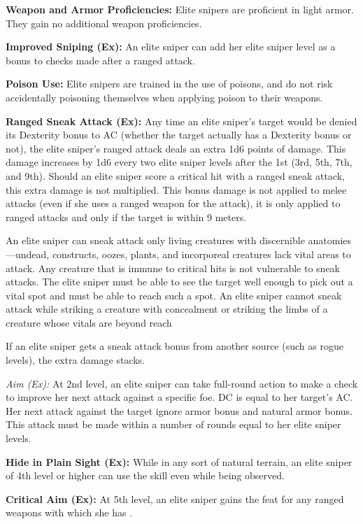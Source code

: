 {
\textbf{Weapon and Armor Proficiencies:} Elite snipers are proficient in light armor. They gain no additional weapon proficiencies.

\textbf{Improved Sniping (Ex):} An elite sniper can add her elite sniper level as a bonus to  checks made after a ranged attack.

\textbf{Poison Use:} Elite snipers are trained in the use of poisons, and do not risk accidentally poisoning themselves when applying poison to their weapons.

\textbf{Ranged Sneak Attack (Ex):} Any time an elite sniper's target would be denied its Dexterity bonus to AC (whether the target actually has a Dexterity bonus or not), the elite sniper's ranged attack deals an extra 1d6 points of damage. This damage increases by 1d6 every two elite sniper levels after the 1st (3rd, 5th, 7th, and 9th). Should an elite sniper score a critical hit with a ranged sneak attack, this extra damage is not multiplied. This bonus damage is not applied to melee attacks (even if she uses a ranged weapon for the attack), it is only applied to ranged attacks and only if the target is within 9 meters.

An elite sniper can sneak attack only living creatures with discernible anatomies---undead, constructs, oozes, plants, and incorporeal creatures lack vital areas to attack. Any creature that is immune to critical hits is not vulnerable to sneak attacks. The elite sniper must be able to see the target well enough to pick out a vital spot and must be able to reach such a spot. An elite sniper cannot sneak attack while striking a creature with concealment or striking the limbs of a creature whose vitals are beyond reach\

If an elite sniper gets a sneak attack bonus from another source (such as rogue levels), the extra damage stacks.

\textit{Aim (Ex):} At 2nd level, an elite sniper can take full-round action to make a  check to improve her next attack against a specific foe. DC is equal to her target's AC. Her next attack against the target ignore armor bonus and natural armor bonus. This attack must be made within a number of rounds equal to \onehalf her elite sniper levels.

\textbf{Hide in Plain Sight (Ex):} While in any sort of natural terrain, an elite sniper of 4th level or higher can use the  skill even while being observed.

\textbf{Critical Aim (Ex):} At 5th level, an elite sniper gains the  feat for any ranged weapons with which she has .

}

